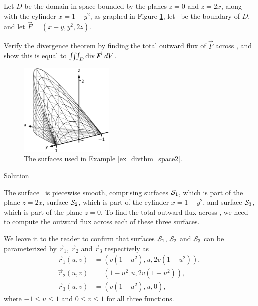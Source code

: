 \begin{example}
\label{ex_divthm_space2}
Let $D$ be the domain in space bounded by the planes $z=0$ and $z=2x$, along with the cylinder $x=1-y^2$, as graphed in Figure \ref{fig_Vector_Calc_29}, let \surfaceS\ be the boundary of $D$, and let $\vec F = \left( x+y,y^2, 2z\right)$. 


Verify the divergence theorem by finding the total outward flux of $\vec F$ across \surfaceS, and show this is equal to $\iiint_D \divv\vec F\ dV$.


\begin{figure}[H]
	\begin{center}
			\includegraphics[width=0.4\textwidth]{fig_Vector_Calc_29}
	\caption{The surfaces used in  Example \ref{ex_divthm_space2}.}
	\label{fig_Vector_Calc_29}
	\end{center}
\end{figure}

\pagebreak
{}Solution 

The surface \surfaceS\ is piecewise smooth, comprising surfaces $\mathcal{S}_1$, which is part of the plane $z=2x$, surface $\mathcal{S}_2$, which is part of the cylinder $x=1-y^2$, and surface $\mathcal{S}_3$, which is part of the plane $z=0$. To find the total outward flux across \surfaceS, we need to compute the outward flux across each of these three surfaces.

We leave it to the reader to confirm that surfaces $\mathcal{S}_1$, $\mathcal{S}_2$ and $\mathcal{S}_3$ can be parameterized by $\vec r_1$, $\vec r_2$ and $\vec r_3$ respectively as
\begin{align*}
\vec r_1(u,v) &= \left( v\left(1-u^2\right), u, 2v\left(1-u^2\right)\right), \\
\vec r_2(u,v) &= \left( 1-u^2, u, 2v\left(1-u^2\right)\right),\\
\vec r_3(u,v) &= \left( v\left(1-u^2\right), u, 0\right),
\end{align*}
where $-1\leq u\leq 1$ and $0\leq v\leq 1$ for all three functions.


\end{example}
